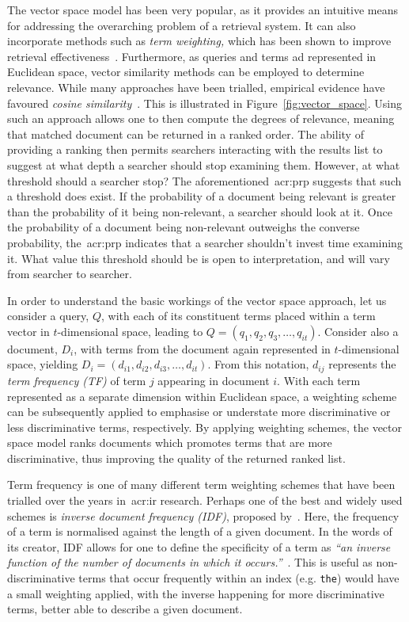 The vector space model has been very popular, as it provides an intuitive means for addressing the overarching problem of a retrieval system. It can also incorporate methods such as \emph{term weighting,} which has been shown to improve retrieval effectiveness~\citep{croft2010search}. Furthermore, as queries and terms ad represented in Euclidean space, vector similarity methods can be employed to determine relevance. While many approaches have been trialled, empirical evidence have favoured \emph{cosine similarity}~\citep{croft2010search}. This is illustrated in Figure~\ref{fig:vector_space}. Using such an approach allows one to then compute the degrees of relevance, meaning that matched document can be returned in a ranked order. The ability of providing a ranking then permits searchers interacting with the results list to suggest at what depth a searcher should stop examining them. However, at what threshold should a searcher stop? The aforementioned~\gls{acr:prp} suggests that such a threshold does exist. If the probability of a document being relevant is greater than the probability of it being non-relevant, a searcher should look at it. Once the probability of a document being non-relevant outweighs the converse probability, the~\gls{acr:prp} indicates that a searcher shouldn't invest time examining it. What value this threshold should be is open to interpretation, and will vary from searcher to searcher.

In order to understand the basic workings of the vector space approach, let us consider a query, $Q$, with each of its constituent terms placed within a term vector in $t$-dimensional space, leading to $Q = (q_1, q_2, q_3,\dotsc, q_{it})$. Consider also a document, $D_i$, with terms from the document again represented in $t$-dimensional space, yielding $D_i = (d_{i1}, d_{i2}, d_{i3},\dotsc, d_{it})$. From this notation, $d_{ij}$ represents the \emph{term frequency (TF)} of term $j$ appearing in document $i$. With each term represented as a separate dimension within Euclidean space, a weighting scheme can be subsequently applied to emphasise or understate more discriminative or less discriminative terms, respectively. By applying weighting schemes, the vector space model ranks documents which promotes terms that are more discriminative, thus improving the quality of the returned ranked list.

Term frequency is one of many different term weighting schemes that have been trialled over the years in~\gls{acr:ir} research. Perhaps one of the best and widely used schemes is \emph{inverse document frequency (IDF)}, proposed by~\cite{sparck1972statistical}. Here, the frequency of a term is normalised against the length of a given document. In the words of its creator, IDF allows for one to define the specificity of a term as \emph{``an inverse function of the number of documents in which it occurs.''}~\citep{sparck1972statistical}. This is useful as non-discriminative terms that occur frequently within an index (e.g. \texttt{the}) would have a small weighting applied, with the inverse happening for more discriminative terms, better able to describe a given document.

